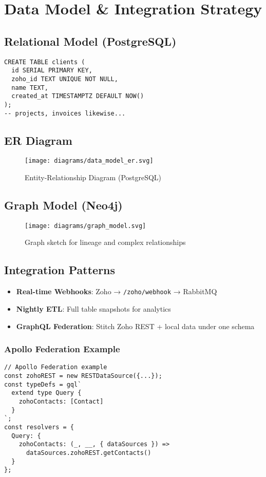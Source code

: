 \section{Data Model \& Integration Strategy}

\subsection{Relational Model (PostgreSQL)}
\begin{verbatim}
CREATE TABLE clients (
  id SERIAL PRIMARY KEY,
  zoho_id TEXT UNIQUE NOT NULL,
  name TEXT,
  created_at TIMESTAMPTZ DEFAULT NOW()
);
-- projects, invoices likewise...
\end{verbatim}

\subsection{ER Diagram}
\begin{figure}[h]
  \centering
  \texttt{[image: diagrams/data\_model\_er.svg]}
  \caption{Entity-Relationship Diagram (PostgreSQL)}
\end{figure}

\subsection{Graph Model (Neo4j)}
\begin{figure}[h]
  \centering
  \texttt{[image: diagrams/graph\_model.svg]}
  \caption{Graph sketch for lineage and complex relationships}
\end{figure}

\subsection{Integration Patterns}
\begin{itemize}
  \item \textbf{Real-time Webhooks}: Zoho → \texttt{/zoho/webhook} → RabbitMQ
  \item \textbf{Nightly ETL}: Full table snapshots for analytics
  \item \textbf{GraphQL Federation}: Stitch Zoho REST + local data under one schema
\end{itemize}

\subsubsection{Apollo Federation Example}
\begin{verbatim}
// Apollo Federation example
const zohoREST = new RESTDataSource({...});
const typeDefs = gql`
  extend type Query {
    zohoContacts: [Contact]
  }
`;
const resolvers = {
  Query: { 
    zohoContacts: (_, __, { dataSources }) => 
      dataSources.zohoREST.getContacts() 
  }
};
\end{verbatim} 